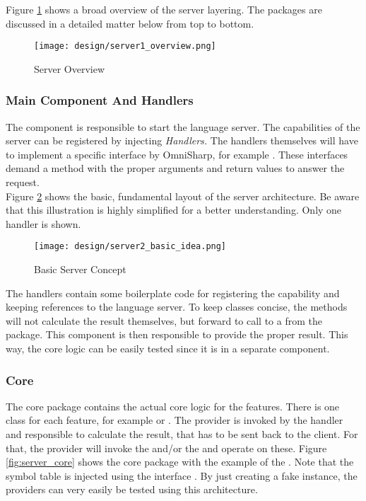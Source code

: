 Figure \ref{fig:server_overview} shows a broad overview of the server layering.
The packages are discussed in a detailed matter below from top to bottom.

\begin{figure}[h]
    \centering
    \texttt{[image: design/server1\_overview.png]}
    \caption{Server Overview}
    \label{fig:server_overview}
\end{figure}

\subsubsection{Main Component And Handlers}
The  component is responsible to start the language server.
The capabilities of the server can be registered by injecting \textit{Handlers.}
The handlers themselves will have to implement a specific interface by OmniSharp, for example .
These interfaces demand a  method with the proper arguments and return values to answer the request.\\

Figure \ref{fig:server_basic_idea} shows the basic, fundamental layout of the server architecture.
Be aware that this illustration is highly simplified for a better understanding.
Only one handler is shown.\\

\begin{figure}[ht]
    \centering
    \texttt{[image: design/server2\_basic\_idea.png]}
    \caption{Basic Server Concept}
    \label{fig:server_basic_idea}
\end{figure}

The handlers contain some boilerplate code for registering the capability and keeping references to the language server.
To keep classes concise, the  methods will not calculate the result themselves, but forward to call to a  from the  package.
This component is then responsible to provide the proper result.
This way, the core logic can be easily tested since it is in a separate component.\\

\subsubsection {Core}
The core package contains the actual core logic for the features.
There is one class for each feature, for example  or .
The provider is invoked by the handler and responsible to calculate the result, that has to be sent back to the client.
For that, the provider will invoke the  and/or the  and operate on these.
Figure \ref{fig:server_core} shows the core package with the example of the .
Note that the symbol table is injected using the interface .
By just creating a fake instance, the providers can very easily be tested using this architecture.


